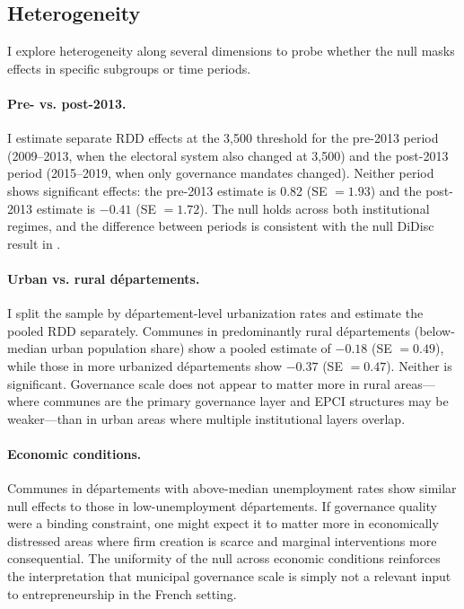 \documentclass[12pt]{article}
\begin{document}
\subsection{Heterogeneity}

I explore heterogeneity along several dimensions to probe whether the null masks effects in specific subgroups or time periods.

\paragraph{Pre- vs. post-2013.} I estimate separate RDD effects at the 3,500 threshold for the pre-2013 period (2009--2013, when the electoral system also changed at 3,500) and the post-2013 period (2015--2019, when only governance mandates changed). Neither period shows significant effects: the pre-2013 estimate is 0.82 (SE $= 1.93$) and the post-2013 estimate is $-0.41$ (SE $= 1.72$). The null holds across both institutional regimes, and the difference between periods is consistent with the null DiDisc result in .

\paragraph{Urban vs. rural d\'{e}partements.} I split the sample by d\'{e}partement-level urbanization rates and estimate the pooled RDD separately. Communes in predominantly rural d\'{e}partements (below-median urban population share) show a pooled estimate of $-0.18$ (SE $= 0.49$), while those in more urbanized d\'{e}partements show $-0.37$ (SE $= 0.47$). Neither is significant. Governance scale does not appear to matter more in rural areas---where communes are the primary governance layer and EPCI structures may be weaker---than in urban areas where multiple institutional layers overlap.

\paragraph{Economic conditions.} Communes in d\'{e}partements with above-median unemployment rates show similar null effects to those in low-unemployment d\'{e}partements. If governance quality were a binding constraint, one might expect it to matter more in economically distressed areas where firm creation is scarce and marginal interventions more consequential. The uniformity of the null across economic conditions reinforces the interpretation that municipal governance scale is simply not a relevant input to entrepreneurship in the French setting.
\end{document}
